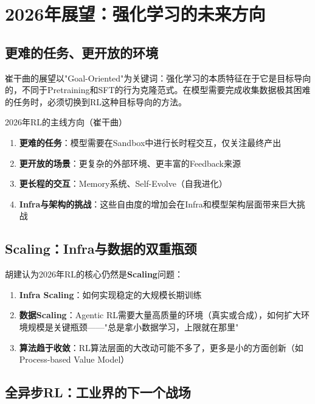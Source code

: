 \section{2026年展望：强化学习的未来方向}

\subsection{更难的任务、更开放的环境}

崔干曲的展望以"Goal-Oriented"为关键词：强化学习的本质特征在于它是目标导向的，不同于Pretraining和SFT的行为克隆范式。在模型需要完成收集数据极其困难的任务时，必须切换到RL这种目标导向的方法。

\begin{importantbox}{2026年RL的主线方向（崔干曲）}
\begin{enumerate}
    \item \textbf{更难的任务}：模型需要在Sandbox中进行长时程交互，仅关注最终产出
    \item \textbf{更开放的场景}：更复杂的外部环境、更丰富的Feedback来源
    \item \textbf{更长程的交互}：Memory系统、Self-Evolve（自我进化）
    \item \textbf{Infra与架构的挑战}：这些自由度的增加会在Infra和模型架构层面带来巨大挑战
\end{enumerate}
\end{importantbox}

\subsection{Scaling：Infra与数据的双重瓶颈}

胡建认为2026年RL的核心仍然是\textbf{Scaling}问题：

\begin{enumerate}
    \item \textbf{Infra Scaling}：如何实现稳定的大规模长期训练
    \item \textbf{数据Scaling}：Agentic RL需要大量高质量的环境（真实或合成），如何扩大环境规模是关键瓶颈——"总是拿小数据学习，上限就在那里"
    \item \textbf{算法趋于收敛}：RL算法层面的大改动可能不多了，更多是小的方面创新（如Process-based Value Model）
\end{enumerate}

\subsection{全异步RL：工业界的下一个战场}

